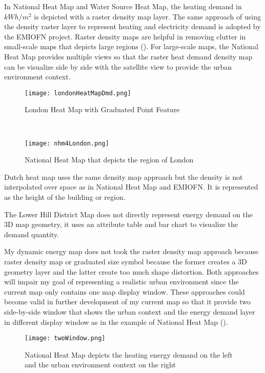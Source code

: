 In National Heat Map and Water Source Heat Map, the heating demand in
$kWh/m^2$ is depicted with a raster density map layer. The same
approach of using the density raster layer to represent heating and
electricity demand is adopted by the EMIOFN project.  Raster density
maps are helpful in removing clutter in small-scale maps that depicts
large regions (). For large-scale maps, the
National Heat Map provides multiple views so that the raster heat
demand density map can be visualize side by side with the satellite
view to provide the urban environment context.
\begin{figure}[h!]
  \centering
  \texttt{[image: londonHeatMapDmd.png]}
  \caption[London Heat Map with Graduated Point Feature]{London Heat
    Map with Graduated Point Feature~\cite{londonHeatMapMap}}
  \label{fig:londonHeatMapDmd}
\end{figure}
~
\begin{figure}[h!]
  \centering
  \texttt{[image: nhm4London.png]}
  \caption[National Heat Map for London]{National Heat Map that
    depicts the region of London~\cite{londonHeatMapMap}}
  \label{fig:nhm4London}
\end{figure}

Dutch heat map uses the same density map approach but the density is
not interpolated over space as in National Heat Map and EMIOFN. It is
represented as the height of the building or region.

The Lower Hill District Map does not directly represent energy demand
on the 3D map geometry, it uses an attribute table and bar chart to
visualize the demand quantity.

My dynamic energy map does not took the raster density map approach
because raster density map or graduated size symbol because the former
creates a 3D geometry layer and the latter create too much shape
distortion. Both approaches will impair my goal of representing a
realistic urban environment since the current map only contains one
map display window. These approaches could become valid in further
development of my current map so that it provide two side-by-side
window that shows the urban context and the energy demand layer in
different display window as in the example of National Heat Map
().

\begin{figure}[h!]
  \centering
  \texttt{[image: twoWindow.png]}
  \caption[Two Window Display of National Heat Map]{National Heat Map
    depicts the heating energy demand on the left and the urban
    environment context on the right~\cite{londonHeatMapMap}}
  \label{fig:twoWindow}
\end{figure}

